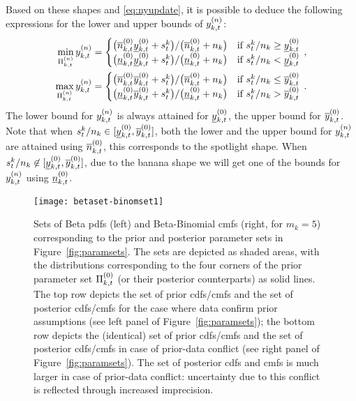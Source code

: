 \documentclass[12pt, a4paper]{elsarticle}
\begin{document}
Based on these shapes and \eqref{eq:nyupdate}, it is possible to deduce the following expressions
for the lower and upper bounds of $y^{(n)}_{k,t}$:
\begin{align}
\begin{aligned}
\min_{\Pi^{(n)}_{k,t}} y^{(n)}_{k,t} &=
 \begin{cases}
 \big(\overline{n}^{(0)}_{k,t} \underline{y}^{(0)}_{k,t} + s^k_t\big) / \big(\overline{n}^{(0)}_{k,t} + n_k\big) & \text{if } s^k_t/n_k \ge \underline{y}^{(0)}_{k,t} \\
 \big(\underline{n}^{(0)}_{k,t} \underline{y}^{(0)}_{k,t} + s^k_t\big) / \big(\underline{n}^{(0)}_{k,t} + n_k\big) & \text{if } s^k_t/n_k <   \underline{y}^{(0)}_{k,t}
 \end{cases}\,,\\
\max_{\Pi^{(n)}_{k,t}} y^{(n)}_{k,t} &=
 \begin{cases}
 \big(\overline{n}^{(0)}_{k,t} \overline{y}^{(0)}_{k,t} + s^k_t\big) / \big(\overline{n}^{(0)}_{k,t} + n_k\big) & \text{if } s^k_t/n_k \le \overline{y}^{(0)}_{k,t} \\
 \big(\underline{n}^{(0)}_{k,t} \overline{y}^{(0)}_{k,t} + s^k_t\big) / \big(\underline{n}^{(0)}_{k,t} + n_k\big) & \text{if } s^k_t/n_k >   \overline{y}^{(0)}_{k,t}
 \end{cases}\,.
\end{aligned}
\label{eq:ysetupdate}
\end{align}
The lower bound for $y^{(n)}_{k,t}$ is always attained for $\underline{y}^{(0)}_{k,t}$, the upper bound for $\overline{y}^{(0)}_{k,t}$.
Note that when $s^k_t/n_k \in [\underline{y}^{(0)}_{k,t}, \overline{y}^{(0)}_{k,t}]$,
both the lower and the upper bound for $y^{(n)}_{k,t}$ are attained using $\overline{n}^{(0)}_{k,t}$,
this corresponds to the spotlight shape.
When $s^k_t/n_k \not\in [\underline{y}^{(0)}_{k,t}, \overline{y}^{(0)}_{k,t}]$,
due to the banana shape
we will get one of the bounds for $y^{(n)}_{k,t}$ using $\underline{n}^{(0)}_{k,t}$.

\begin{figure}
\texttt{[image: betaset-binomset1]}
\caption{Sets of Beta pdfs (left) and Beta-Binomial cmfs (right, for $m_k=5$)
corresponding to the prior and posterior parameter sets in Figure~\ref{fig:paramsets}.
The sets are depicted as shaded areas,
with the distributions corresponding to the four corners
of the prior parameter set $\Pi^{(0)}_{k,t}$ (or their posterior counterparts) as solid lines.
The top row depicts the set of prior cdfs/cmfs and the set of posterior cdfs/cmfs for the case where data confirm prior assumptions
(see left panel of Figure~\ref{fig:paramsets});
the bottom row depicts the (identical) set of prior cdfs/cmfs and the set of posterior cdfs/cmfs in case of prior-data conflict
(see right panel of Figure~\ref{fig:paramsets}).
The set of posterior cdfs and cmfs
is much larger in case of prior-data conflict:
uncertainty due to this conflict is reflected through increased imprecision.}
\label{fig:betaset-binomset}
\end{figure}
\end{document}
